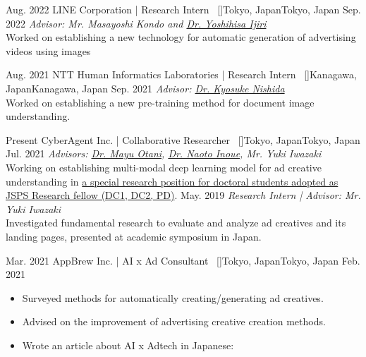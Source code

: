 
\begin{experiences}
    \researchexperience
    {Aug. 2022}   {LINE Corporation | Research Intern{\normalfont  ~ [\href{https://linecorp.com/en/}{\small{\websiteSymbol}}]}}{Tokyo, Japan}{Tokyo, Japan}
    {Sep. 2022} {\textit{Advisor: Mr. Masayoshi Kondo and \href{https://scholar.google.co.jp/citations?user=VVoeVYIAAAAJ}{Dr. Yoshihisa Ijiri}}\\
    Worked on establishing a new technology for automatic generation of advertising videos using images
    }

    \emptySeparator
    \researchexperience
    {Aug. 2021}   {NTT Human Informatics Laboratories | Research Intern{\normalfont  ~ [\href{https://www.rd.ntt/e/hil/}{\small{\websiteSymbol}}]}}{Kanagawa, Japan}{Kanagawa, Japan}
    {Sep. 2021} {\textit{Advisor: \href{https://www.knishida.info/}{Dr. Kyosuke Nishida}}\\
    Worked on establishing a new pre-training method for document image understanding.
    }

    \emptySeparator
    \researchexperience
    {Present}   {CyberAgent Inc. | Collaborative Researcher{\normalfont  ~ [\href{https://www.cyberagent.co.jp/news/detail/id=26231}{\small{\websiteSymbol}}]}}{Tokyo, Japan}{Tokyo, Japan}
    {Jul. 2021} {\textit{Advisors: \href{https://mayu-ot.github.io/}{Dr. Mayu Otani}, \href{https://naoto0804.github.io/}{Dr. Naoto Inoue}, {Mr. Yuki Iwazaki}}\\
    Working on establishing multi-modal deep learning model for ad creative understanding in \href{https://www.cyberagent.co.jp/news/detail/id=26231}{a special research position for doctoral students adopted as JSPS Research fellow (DC1, DC2, PD)}.
    \vskip 0.1cm
    }
    \researchexperience
    {}   {}{}{}
    {May. 2019} {\textit{Research Intern | Advisor: {Mr. Yuki Iwazaki}}\\
    Investigated fundamental research to evaluate and analyze ad creatives and its landing pages, presented at academic symposium in Japan.
    }

    \emptySeparator
    \researchexperience
    {Mar. 2021}   {AppBrew Inc. | AI x Ad Consultant{\normalfont  ~ [\href{https://appbrew.io/}{\small{\websiteSymbol}}]}}{Tokyo, Japan}{Tokyo, Japan}
    {Feb. 2021} {
    \begin{itemize}
        \item Surveyed methods for automatically creating/generating ad creatives.
        \item Advised on the improvement of advertising creative creation methods.
        \item Wrote an article about AI x Adtech in Japanese:
    \end{itemize}
    }


\end{experiences}
